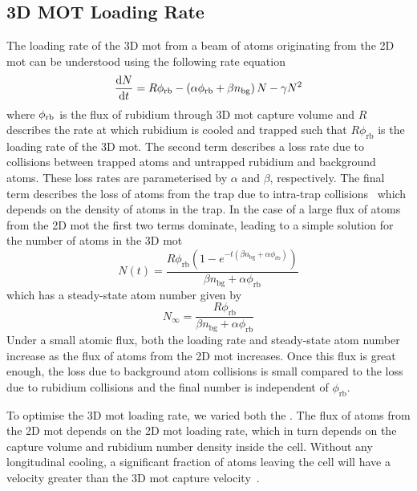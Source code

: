 \subsection{3D MOT Loading Rate}\label{subsec:loading_rate}

The loading rate of the 3D \ac{mot} from a beam of atoms originating from the 2D
\ac{mot} can be understood using the following rate equation
\begin{equation}
	\frac{\mathrm{d} N}{\mathrm{d}t} = R  \phi_\textnormal{rb} - \left(\alpha \phi_\textnormal{rb}  + \beta n_\textnormal{bg} \right) N - \gamma N^2
	\label{eq:loading_rate}
\end{equation}
where \(\phi_\textnormal{rb}\) is the flux of rubidium through 3D \ac{mot} capture volume and \(R\) describes the rate at which rubidium is cooled and trapped such that \( R \phi_\text{rb}\) is the loading rate of the 3D \ac{mot}. The second term describes a loss rate due to collisions between trapped atoms and untrapped rubidium and
background atoms. These loss rates are parameterised by \(\alpha\) and
\(\beta\), respectively. The final term describes the loss of atoms from the trap due to intra-trap collisions~\cite{Prentiss1988} which depends on the density of atoms in the trap. In the case of a large flux of atoms from the 2D \ac{mot} the first two terms dominate, leading to a simple solution for the number of atoms in the 3D \ac{mot}
\begin{equation}
	N(t) = \frac{R \phi _{\text{rb}} \left(1-e^{-t \left(\beta  n_{\text{bg}}+\alpha  \phi _{\text{rb}}\right)}\right)}{\beta  n_{\text{bg}}+\alpha  \phi _{\text{rb}}}
	\label{eq:atom_number}
\end{equation}
which has a steady-state atom number given by 
\begin{equation}
	N_\infty = \frac{R \phi _{\text{rb}}}{\beta  n_{\text{bg}}+\alpha  \phi _{\text{rb}}}
\end{equation}
Under a small atomic flux, both the loading rate and steady-state atom number increase as the flux of atoms from the 2D \ac{mot} increases. Once this flux is great enough, the loss due to background atom collisions is small compared to the loss due to rubidium collisions and the final number is independent of \(\phi_\text{rb}\).
\par\noindent
To optimise the 3D \ac{mot} loading rate, we varied both the . The flux of atoms from the 2D \ac{mot} depends on the 2D \ac{mot} loading rate, which in turn depends on the capture volume and rubidium number density inside the cell.  Without any longitudinal cooling, a significant fraction of atoms leaving the cell will have a velocity greater than the 3D \ac{mot} capture velocity~\cite{Schoser2002}. 

